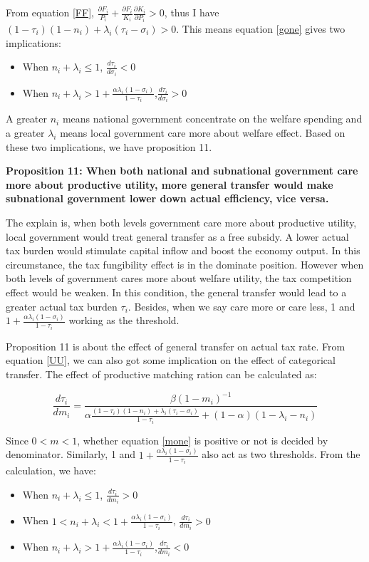 From equation \ref{FF}, $\frac{\partial F_i}{P_i}+\frac{\partial F_i}{K_i}\frac{\partial K_i}{\partial P_i}>0$, thus I have $(1-\tau_i)(1-n_i)+\lambda_i(\tau_i-\sigma_i)>0$. This means equation \ref{gone} gives two implications:
\begin{itemize}
    \item When $n_i+\lambda_i \leq 1$, $\frac{d \tau_i}{d \sigma_i}<0$
    \item When $n_i+\lambda_i>1+\frac{\alpha \lambda_i(1-\sigma_i)}{1-\tau_i}$,$\frac{d \tau_i}{d \sigma_i}>0$
\end{itemize}

A greater $n_i$ means national government concentrate on the welfare spending and a greater $\lambda_i$ means local government care more about welfare effect. Based on these two implications, we have proposition 11.

\textbf{Proposition 11: When both national and subnational government care more about productive utility, more general transfer would make subnational government lower down actual efficiency, vice versa.}

The explain is, when both levels government care more about productive utility, local government would treat general transfer as a free subsidy. A lower actual tax burden would stimulate capital inflow and boost the economy output. In this circumstance, the tax fungibility effect is in the dominate position. However when both levels of government cares more about welfare utility, the tax competition effect would be weaken. In this condition, the general transfer would lead to a greater actual tax burden $\tau_i$. Besides, when we say care more or care less, 1 and $1+\frac{\alpha \lambda_i(1-\sigma_i)}{1-\tau_i}$ working as the threshold.



Proposition 11 is about the effect of general transfer on actual tax rate. From equation \ref{UU}, we can also got some implication on the effect of categorical transfer. The effect of productive matching ration can be calculated as:

\begin{equation}
    \frac{d \tau_i}{d m_i}=\frac{\beta(1-m_i)^{-1}}{\alpha \frac{\left(1-\tau_i\right)\left(1-n_i\right)+\lambda_i\left(\tau_i-\sigma_i\right)}{1-\tau_i}+(1-\alpha)(1-\lambda_i-n_i)} \label{mone}
\end{equation}

Since $0<m<1$, whether equation \ref{mone} is positive or not is decided by denominator. Similarly, 1 and $1+\frac{\alpha \lambda_i(1-\sigma_i)}{1-\tau_i}$ also act as two thresholds. From the calculation, we have:
\begin{itemize}
    \item When $n_i+\lambda_i\leq 1$, $\frac{d \tau_i}{d m_i}>0$
    \item When $1<n_i+\lambda_i<1+\frac{\alpha \lambda_i(1-\sigma_i)}{1-\tau_i}$, $\frac{d \tau_i}{d m_i}>0$
    \item When $n_i+\lambda_i>1+\frac{\alpha \lambda_i(1-\sigma_i)}{1-\tau_i}$,$\frac{d \tau_i}{d m_i}<0$
\end{itemize}

